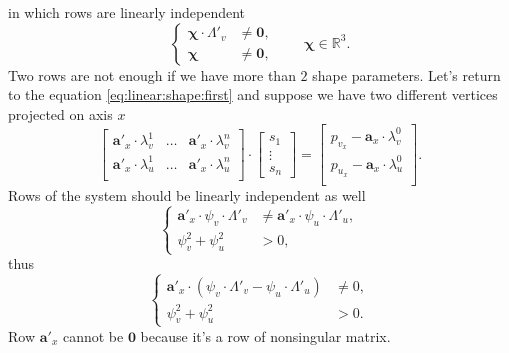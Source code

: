 in which rows are linearly independent
\begin{equation}\label{eq:vertex-components:independent}
  \left\{\begin{aligned}
    \pmb{\chi} \cdot \Lambda'_v &\neq \pmb{0}, \\
    \pmb{\chi} &\neq \pmb{0},
  \end{aligned}\right.
  \qquad \pmb{\chi} \in \mathbb{R}^3.
\end{equation}
Two rows are not enough if we have more than $2$ shape parameters.
Let's return to the equation \eqref{eq:linear:shape:first}
and suppose we have two different vertices projected on axis $x$
\begin{equation*}
  \begin{bmatrix}
    \pmb{a}'_x \cdot \lambda^1_v & \dots & \pmb{a}'_x \cdot \lambda^n_v \\
    \pmb{a}'_x \cdot \lambda^1_u & \dots & \pmb{a}'_x \cdot \lambda^n_u \\
  \end{bmatrix}
  \cdot \begin{bmatrix}
    s_1 \\
    \vdots \\
    s_n
  \end{bmatrix}
  = \begin{bmatrix}
    p_{v_x} - \pmb{a}_x \cdot \lambda^0_v \\
    p_{u_x} - \pmb{a}_x \cdot \lambda^0_u \\
  \end{bmatrix}.
\end{equation*}
Rows of the system should be linearly independent as well
\begin{equation*}
  \left\{\begin{aligned}
    \pmb{a}'_x \cdot \psi_v \cdot \Lambda'_v
    &\neq \pmb{a}'_x \cdot \psi_u \cdot \Lambda'_u, \\
    \psi_v^2 + \psi_u^2 &> 0,
  \end{aligned}\right.
\end{equation*}
thus
\begin{equation*}
  \left\{\begin{aligned}
    \pmb{a}'_x \cdot \left( \psi_v \cdot \Lambda'_v
                    - \psi_u \cdot \Lambda'_u \right)
      &\neq 0, \\
    \psi_v^2 + \psi_u^2 &> 0.
  \end{aligned}\right.
\end{equation*}
Row $\pmb{a}'_x$ cannot be $\pmb{0}$ because it's a row of nonsingular matrix.
